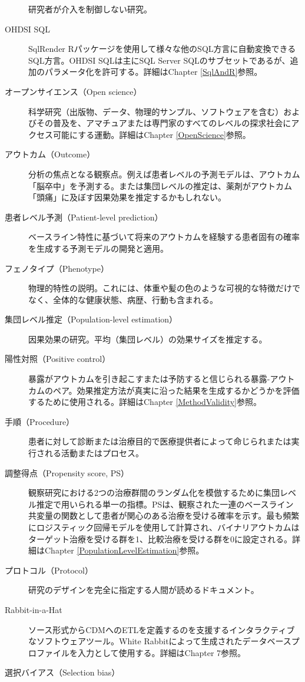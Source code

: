 \documentclass[
  11pt]{book}
\theoremstyle{definition}
\theoremstyle{definition}
\theoremstyle{definition}
\theoremstyle{definition}
\theoremstyle{remark}
\begin{document}
\begin{description}
研究者が介入を制御しない研究。
\item[OHDSI SQL]
SqlRender Rパッケージを使用して様々な他のSQL方言に自動変換できるSQL方言。OHDSI SQLは主にSQL Server SQLのサブセットであるが、追加のパラメータ化を許可する。詳細はChapter \ref{SqlAndR}参照。
\item[オープンサイエンス（Open science）]
科学研究（出版物、データ、物理的サンプル、ソフトウェアを含む）およびその普及を、アマチュアまたは専門家のすべてのレベルの探求社会にアクセス可能にする運動。詳細はChapter \ref{OpenScience}参照。
\item[アウトカム（Outcome）]
分析の焦点となる観察点。例えば患者レベルの予測モデルは、アウトカム「脳卒中」を予測する。または集団レベルの推定は、薬剤がアウトカム「頭痛」に及ぼす因果効果を推定するかもしれない。
\item[患者レベル予測（Patient-level prediction）]
ベースライン特性に基づいて将来のアウトカムを経験する患者固有の確率を生成する予測モデルの開発と適用。
\item[フェノタイプ（Phenotype）]
物理的特性の説明。これには、体重や髪の色のような可視的な特徴だけでなく、全体的な健康状態、病歴、行動も含まれる。
\item[集団レベル推定（Population-level estimation）]
因果効果の研究。平均（集団レベル）の効果サイズを推定する。
\item[陽性対照（Positive control）]
暴露がアウトカムを引き起こすまたは予防すると信じられる暴露-アウトカムのペア。効果推定方法が真実に沿った結果を生成するかどうかを評価するために使用される。詳細はChapter \ref{MethodValidity}参照。
\item[手順（Procedure）]
患者に対して診断または治療目的で医療提供者によって命じられまたは実行される活動またはプロセス。
\item[調整得点（Propensity score, PS）]
観察研究における2つの治療群間のランダム化を模倣するために集団レベル推定で用いられる単一の指標。PSは、観察された一連のベースライン共変量の関数として患者が関心のある治療を受ける確率を示す。最も頻繁にロジスティック回帰モデルを使用して計算され、バイナリアウトカムはターゲット治療を受ける群を1、比較治療を受ける群を0に設定される。詳細はChapter \ref{PopulationLevelEstimation}参照。
\item[プロトコル（Protocol）]
研究のデザインを完全に指定する人間が読めるドキュメント。
\item[Rabbit-in-a-Hat]
ソース形式からCDMへのETLを定義するのを支援するインタラクティブなソフトウェアツール。White Rabbitによって生成されたデータベースプロファイルを入力として使用する。詳細はChapter 7参照。
\item[選択バイアス（Selection bias）]

\end{description}
\end{document}
